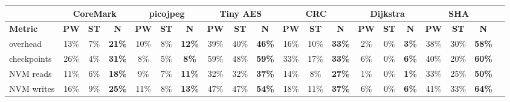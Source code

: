 \begin{tabular}{@{}l|ccccccccccccccccccc@{}}
\toprule
 & \multicolumn{3}{c}{\textbf{\textsf{CoreMark}}} & \multicolumn{3}{c}{\textbf{\textsf{picojpeg}}} & \multicolumn{3}{c}{\textbf{\textsf{Tiny AES}}} & \multicolumn{3}{c}{\textbf{\textsf{CRC}}} & \multicolumn{3}{c}{\textbf{\textsf{Dijkstra}}} & \multicolumn{3}{c}{\textbf{\textsf{SHA}}} \\ \midrule
\textbf{Metric} & \textbf{\textsf{PW}} & \textbf{\textsf{ST}} & \textbf{\textsf{N}} & \textbf{\textsf{PW}} & \textbf{\textsf{ST}} & \textbf{\textsf{N}} & \textbf{\textsf{PW}} & \textbf{\textsf{ST}} & \textbf{\textsf{N}} & \textbf{\textsf{PW}} & \textbf{\textsf{ST}} & \textbf{\textsf{N}} & \textbf{\textsf{PW}} & \textbf{\textsf{ST}} & \textbf{\textsf{N}} & \textbf{\textsf{PW}} & \textbf{\textsf{ST}} & \textbf{\textsf{N}} \\
overhead & 13\% & \hphantom{0}7\% & \textbf{\colorbox{hightlight!50!white}{21\%}} & 10\% & \hphantom{0}8\% & \textbf{\colorbox{hightlight!42!white}{12\%}} & 39\% & 40\% & \textbf{\colorbox{hightlight!75!white}{46\%}} & 16\% & \hphantom{0}10\% & \textbf{\colorbox{hightlight!63!white}{33\%}} & \hphantom{0}2\% & \hphantom{0}0\% & \textbf{\colorbox{hightlight!32!white}{\hphantom{0}3\%}} & 38\% & 30\% & \textbf{\colorbox{hightlight!87!white}{58\%}} \\
checkpoints & 26\% & \hphantom{0}4\% & \textbf{\colorbox{hightlight!60!white}{31\%}} & \hphantom{0}8\% & \hphantom{0}5\% & \textbf{\colorbox{hightlight!38!white}{\hphantom{0}8\%}} & 59\% & 48\% & \textbf{\colorbox{hightlight!88!white}{59\%}} & 33\% & 17\% & \textbf{\colorbox{hightlight!63!white}{33\%}} & \hphantom{0}6\% & \hphantom{0}0\% & \textbf{\colorbox{hightlight!36!white}{\hphantom{0}6\%}} & 40\% & 20\% & \textbf{\colorbox{hightlight!89!white}{60\%}} \\
NVM reads & 11\% & \hphantom{0}6\% & \textbf{\colorbox{hightlight!47!white}{18\%}} & \hphantom{0}9\% & \hphantom{0}7\% & \textbf{\colorbox{hightlight!40!white}{11\%}} & 32\% & 32\% & \textbf{\colorbox{hightlight!67!white}{37\%}} & 14\% & \hphantom{0}8\% & \textbf{\colorbox{hightlight!57!white}{27\%}} & \hphantom{0}1\% & \hphantom{0}0\% & \textbf{\colorbox{hightlight!31!white}{\hphantom{0}1\%}} & 33\% & 25\% & \textbf{\colorbox{hightlight!80!white}{50\%}} \\
NVM writes & 16\% & \hphantom{0}9\% & \textbf{\colorbox{hightlight!55!white}{25\%}} & 11\% & \hphantom{0}8\% & \textbf{\colorbox{hightlight!42!white}{13\%}} & 47\% & 47\% & \textbf{\colorbox{hightlight!84!white}{54\%}} & 18\% & 11\% & \textbf{\colorbox{hightlight!66!white}{37\%}} & \hphantom{0}6\% & \hphantom{0}0\% & \textbf{\colorbox{hightlight!36!white}{\hphantom{0}6\%}} & 41\% & 33\% & \textbf{\colorbox{hightlight!93!white}{64\%}} \\
 \bottomrule
\end{tabular}
